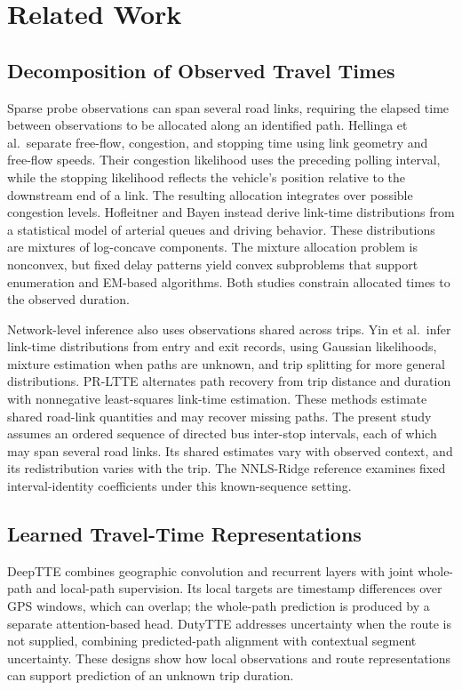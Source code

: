 \section{Related Work}
\subsection{Decomposition of Observed Travel Times}
Sparse probe observations can span several road links, requiring the elapsed time between observations to be allocated along an identified path. Hellinga et al.\ separate free-flow, congestion, and stopping time using link geometry and free-flow speeds\cite{hellinga2008}. Their congestion likelihood uses the preceding polling interval, while the stopping likelihood reflects the vehicle's position relative to the downstream end of a link. The resulting allocation integrates over possible congestion levels. Hofleitner and Bayen instead derive link-time distributions from a statistical model of arterial queues and driving behavior\cite{hofleitner2011}. These distributions are mixtures of log-concave components. The mixture allocation problem is nonconvex, but fixed delay patterns yield convex subproblems that support enumeration and EM-based algorithms. Both studies constrain allocated times to the observed duration.

Network-level inference also uses observations shared across trips. Yin et al.\ infer link-time distributions from entry and exit records, using Gaussian likelihoods, mixture estimation when paths are unknown, and trip splitting for more general distributions\cite{yin2015entryexit}. PR-LTTE alternates path recovery from trip distance and duration with nonnegative least-squares link-time estimation\cite{sun2022prltte}. These methods estimate shared road-link quantities and may recover missing paths. The present study assumes an ordered sequence of directed bus inter-stop intervals, each of which may span several road links. Its shared estimates vary with observed context, and its redistribution varies with the trip. The NNLS-Ridge reference examines fixed interval-identity coefficients under this known-sequence setting.

\subsection{Learned Travel-Time Representations}
DeepTTE combines geographic convolution and recurrent layers with joint whole-path and local-path supervision\cite{wang2018deeptte}. Its local targets are timestamp differences over GPS windows, which can overlap; the whole-path prediction is produced by a separate attention-based head. DutyTTE addresses uncertainty when the route is not supplied, combining predicted-path alignment with contextual segment uncertainty\cite{mao2025dutytte}. These designs show how local observations and route representations can support prediction of an unknown trip duration.

